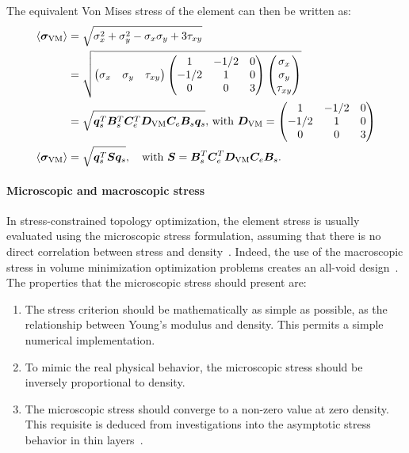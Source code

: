 The equivalent Von Mises stress of the element can then be written as:
\begin{align}
    \langle \bm{\sigma}_{\text{VM}} \rangle &= \sqrt{\sigma_x^2 + \sigma_y^2 - \sigma_x \sigma_y+3\tau_{xy}} \\
    &= \sqrt{
    \begin{pmatrix}
    \sigma_x & \sigma_y & \tau_{xy}
    \end{pmatrix}
    \begin{pmatrix}
    1       &   -1/2    &   0   \\
    -1/2    &   1       &   0   \\
    0       &   0       &   3
    \end{pmatrix}
    \begin{pmatrix}
    \sigma_x \\
    \sigma_y \\
    \tau_{xy}
    \end{pmatrix}} \\
    &= \sqrt{\bm{q}_s^T\bm{B}_s^T\bm{C}_e^T\bm{D}_{\text{VM}}\bm{C}_e\bm{B}_s\bm{q}_s}
    \textrm{,  with } \bm{D}_{\text{VM}} = 
    \begin{pmatrix}
    1       &   -1/2    &   0   \\
    -1/2    &   1       &   0   \\
    0       &   0       &   3
    \end{pmatrix} \\
    \langle \bm{\sigma}_{\text{VM}} \rangle &= \sqrt{\bm{q}_s^T\bm{S}\bm{q}_s}, \quad
    \textrm{with } \bm{S} = \bm{B}_s^T\bm{C}_e^T\bm{D}_{\text{VM}}\bm{C}_e\bm{B}_s.
    \label{eq:03_VM_calc}
\end{align}
\paragraph{Microscopic and macroscopic stress}
In stress-constrained topology optimization, the element stress is usually evaluated using the microscopic stress formulation, assuming that there is no direct correlation between stress and density~. Indeed, the use of the macroscopic stress in volume minimization optimization problems creates an all-void design~. The properties that the microscopic stress should present are:
\begin{enumerate}[label=(\roman*)]
    \item The stress criterion should be mathematically as simple as possible, as the relationship between Young's modulus and density. This permits a simple numerical implementation.
    \item To mimic the real physical behavior, the microscopic stress should be inversely proportional to density.
    \item The microscopic stress should converge to a non-zero value at zero density. This requisite is deduced from investigations into the asymptotic stress behavior in thin layers~.
\end{enumerate}

